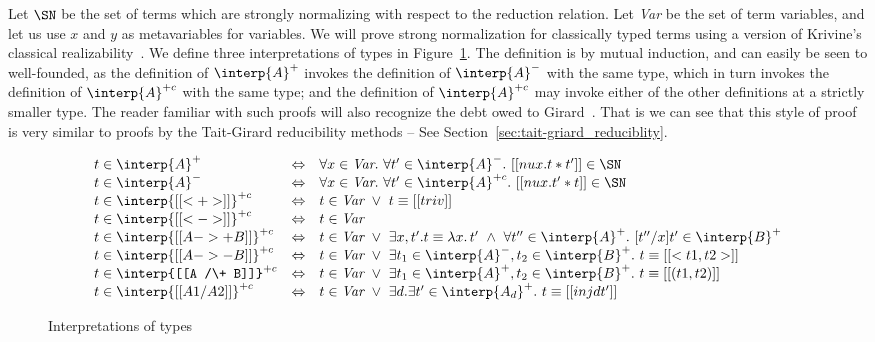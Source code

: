 Let $\SN$ be the set of terms which are strongly normalizing with
respect to the reduction relation.  Let \textit{Var} be the set of
term variables, and let us use $x$ and $y$ as metavariables for
variables.  We will prove strong normalization for classically typed
terms using a version of Krivine's classical
realizability~\cite{krivine09}.  We define three interpretations of
types in Figure~\ref{fig:classreal}.  The definition is by mutual
induction, and can easily be seen to well-founded, as the definition
of $\interp{A}^+$ invokes the definition of $\interp{A}^-$ with the
same type, which in turn invokes the definition of $\interp{A}^{+c}$
with the same type; and the definition of $\interp{A}^{+c}$ may invoke
either of the other definitions at a strictly smaller type.  The
reader familiar with such proofs will also recognize the debt owed to
Girard~\cite{gtl90}.  That is we can see that this style of proof is
very similar to proofs by the Tait-Girard reducibility methods -- See
Section~\ref{sec:tait-griard_reduciblity}.

\begin{figure}
\small
\[
\begin{array}{lll}
t \in \interp{A}^+ & \Leftrightarrow & \forall x \in \textit{Var}.\ \forall t'\in\interp{A}^-.\ [[ nu x . t * t' ]] \in \SN\\
t \in \interp{A}^- & \Leftrightarrow & \forall x \in \textit{Var}.\ \forall t'\in\interp{A}^{+c}.\ [[ nu x . t' * t ]] \in \SN\\
t \in \interp{[[< + >]]}^{+c} & \Leftrightarrow & t \in \textit{Var}\ \vee\ t \equiv [[triv]] \\
t \in \interp{[[< - >]]}^{+c} & \Leftrightarrow & t \in \textit{Var}\\
t \in \interp{[[A ->+ B]]}^{+c} & \Leftrightarrow & t \in \textit{Var}\ \vee\ \exists x, t'. t \equiv \lambda x.\, t'\ \wedge\ \forall t''\in\interp{A}^+.\ [t''/x] t'\in\interp{B}^+\\
t \in \interp{[[A ->- B]]}^{+c} & \Leftrightarrow & t \in \textit{Var}\ \vee\ \exists t_1\in\interp{A}^-, t_2\in\interp{B}^+.\ t \equiv [[ < t1 , t2 >]] \\
t \in \interp{[[A /\+ B]]}^{+c} & \Leftrightarrow & t \in \textit{Var}\ \vee\ \exists t_1\in\interp{A}^+, t_2\in\interp{B}^+.\ t \equiv [[ ( t1 , t2 )]] \\
t \in \interp{[[A1 /\- A2]]}^{+c} & \Leftrightarrow & t \in \textit{Var}\ \vee\ \exists d. \exists t'\in\interp{A_d}^+.\ t \equiv [[ inj d t']] 
\end{array}
\]
\caption{Interpretations of types}
\label{fig:classreal}
\end{figure}

